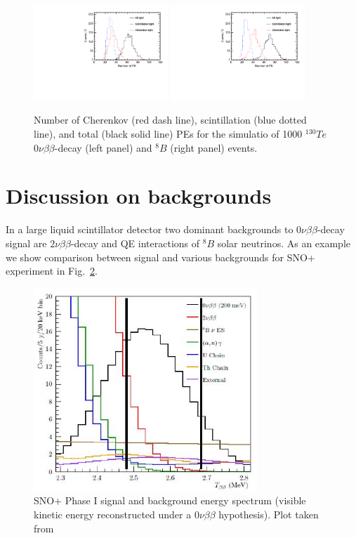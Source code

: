 \documentclass[12pt,twoside,letterpaper]{article}
\newcommand{\vbb}{0\nu\beta\beta}
\newcommand{\vvbb}{2\nu\beta\beta}
\newcommand{\Te}{^{130}Te}
\newcommand{\B}{^{8}B}
\begin{document}
\begin{figure}[htb]
\centering
\includegraphics[angle=0,width=0.45\textwidth]{plots/hMomNPhot_Te130.pdf}
\includegraphics[angle=0,width=0.45\textwidth]{plots/hMomNPhot_1el_2p529MeV.pdf}
\caption{Number of Cherenkov (red dash line), scintillation (blue dotted line), and total (black solid line) PEs for the simulatio of 1000 $\Te$ $\vbb$-decay (left panel) and $\B$ (right panel) events.}
\label{fig:NPhot}
\end{figure}


\section{Discussion on backgrounds}
In a large liquid scintillator detector two dominant backgrounds to $\vbb$-decay signal are $\vvbb$-decay and QE interactions of $\B$ solar neutrinos. As an example we show comparison between signal and various backgrounds for SNO+ experiment in Fig.~\ref{fig:SNOp_bkgs}.


\begin{figure}[htb]
\centering
\includegraphics[angle=0,width=0.75\textwidth]{plots/SNOp_backgrounds.JPG}
\caption{SNO+ Phase I signal and background energy spectrum (visible kinetic energy reconstructed under a $\vbb$ hypothesis). Plot taken from~\cite{SNOp_paper}}
\label{fig:SNOp_bkgs}
\end{figure}
\end{document}
